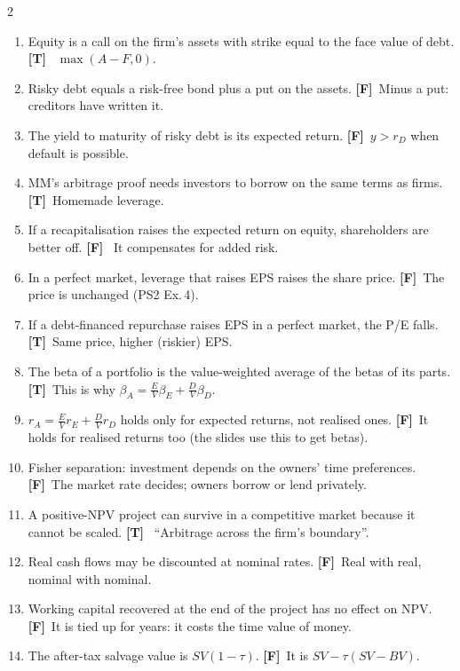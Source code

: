 \documentclass[10pt,a4paper]{article}
\newcommand{\T}{\textbf{\color{ok}[T]}~}
\newcommand{\F}{\textbf{\color{wr}[F]}~}
\begin{document}
\begin{multicols}{2}
\begin{enumerate}[label=\arabic*.,start=19,leftmargin=1.6em,itemsep=2pt]
        safe; flatter once $r_D$ rises.
  \item Equity is a call on the firm's assets with strike equal to the face value of debt. \T
        $\max(A-F,0)$.
  \item Risky debt equals a risk-free bond plus a put on the assets. \F Minus a put: creditors have
        written it.
  \item The yield to maturity of risky debt is its expected return. \F $y>r_D$ when default is
        possible.
  \item MM's arbitrage proof needs investors to borrow on the same terms as firms. \T Homemade
        leverage.
  \item If a recapitalisation raises the expected return on equity, shareholders are better off. \F
        It compensates for added risk.
  \item In a perfect market, leverage that raises EPS raises the share price. \F The price is
        unchanged (PS2 Ex.\,4).
  \item If a debt-financed repurchase raises EPS in a perfect market, the P/E falls. \T Same price,
        higher (riskier) EPS.
  \item The beta of a portfolio is the value-weighted average of the betas of its parts. \T This is
        why $\beta_A=\frac EV\beta_E+\frac DV\beta_D$.
  \item $r_A=\frac EVr_E+\frac DVr_D$ holds only for expected returns, not realised ones. \F It holds
        for realised returns too (the slides use this to get betas).
  \item Fisher separation: investment depends on the owners' time preferences. \F The market rate
        decides; owners borrow or lend privately.
  \item A positive-NPV project can survive in a competitive market because it cannot be scaled. \T
        ``Arbitrage across the firm's boundary''.
  \item Real cash flows may be discounted at nominal rates. \F Real with real, nominal with nominal.
  \item Working capital recovered at the end of the project has no effect on NPV. \F It is tied up
        for years: it costs the time value of money.
  \item The after-tax salvage value is $SV(1-\tau)$. \F It is $SV-\tau(SV-BV)$.
\end{enumerate}


\end{multicols}
\end{document}
